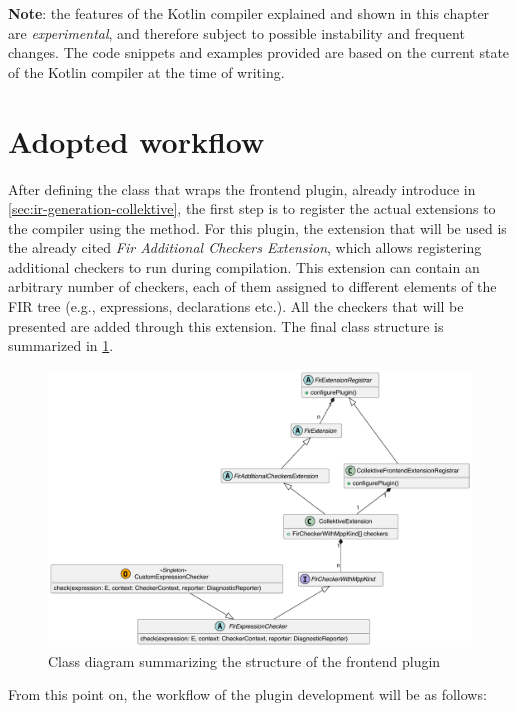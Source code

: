 \documentclass[12pt,a4paper,openright,twoside]{book}
\begin{document}
\textbf{Note}: the features of the Kotlin compiler explained and shown in
this chapter are \emph{experimental}, and therefore subject to possible instability
and frequent changes. The code snippets and examples provided are based on the
current state of the Kotlin compiler at the time of writing. 

\section{Adopted workflow}

After defining the  class that
wraps the frontend plugin, already introduce in \cref{sec:ir-generation-collektive}, the
first step is to register the actual extensions to the compiler using the
 method. For this plugin, the extension that will
be used is the already cited \emph{Fir Additional Checkers Extension}, which
allows registering additional checkers to run during compilation.
%
This extension can contain an arbitrary number of checkers, each of them
assigned to different elements of the \ac{FIR} tree (e.g., expressions,
declarations etc.). All the checkers that will be presented are added 
through this extension. The final class structure is summarized in
\cref{fig:frontend-class-diagram}.

\begin{figure}
  \centering
  \includegraphics[width=.8\linewidth]{figures/frontend-class-diagram.pdf}
  \caption{Class diagram summarizing the structure of the frontend plugin}
  \label{fig:frontend-class-diagram}
\end{figure}

From this point on, the workflow of the plugin development will be as follows:
\end{document}
